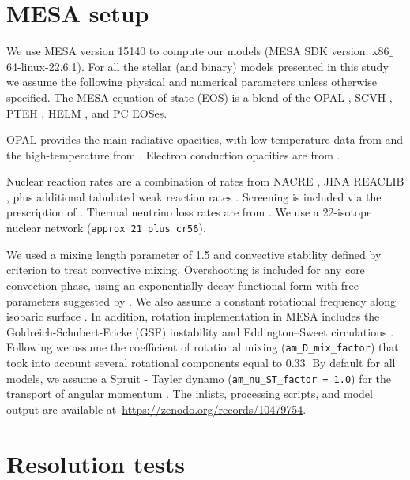 \documentclass{aa}
\begin{document}
\begin{appendix}


\section{MESA setup}
\label{sec:MESA_setup}


We use MESA version 15140 to compute our models (MESA SDK version: x86$\_$64-linux-22.6.1). For all the stellar (and binary) models presented in
this study we assume the following physical and numerical parameters
unless otherwise specified. The MESA equation of
state (EOS) is a blend of the OPAL \citet{Rogers2002}, SCVH
\citet{Saumon1995}, PTEH \citet{Pols1995}, HELM \citet{Timmes2000},
and PC \citet{Potekhin2010} EOSes.

OPAL \citep{Iglesias1993, Iglesias1996} provides the main radiative
opacities, with low-temperature data from \citet{Ferguson2005} and the
high-temperature from \citet{Buchler1976}. Electron conduction
opacities are from \citet{Cassisi2007}.

Nuclear reaction rates are a combination of rates from NACRE
\citep{Angulo1999}, JINA REACLIB \citep{Cyburt2010}, plus additional
tabulated weak reaction rates \citet{Fuller1985, Oda1994,
  Langanke2000}. Screening is included via the prescription of
\citet{Chugunov2007}.  Thermal neutrino loss rates are from
\citet{Itoh1996}. We use a
22-isotope nuclear network (\texttt{approx\_21\_plus\_cr56}).

We used a mixing length parameter of 1.5 and convective stability defined by
\citet{Ledoux_1947} criterion to treat convective mixing. Overshooting
is included for any core convection phase, using an exponentially
decay functional form \cite{Herwig_2000} with free parameters
suggested by \cite{claret:18}. We also assume a constant rotational frequency along
isobaric surface \citep{Ekstrom2012}. In addition, rotation
implementation in MESA includes the Goldreich-Schubert-Fricke (GSF)
instability \citep{Heger_2000} and Eddington–Sweet circulations
\citep{Sweet_1950}. Following \citet{Heger_2000} we assume the
coefficient of rotational mixing (\texttt{am\_D\_mix\_factor}) that
took into account several rotational components equal to 0.33.
By default for all models, we assume a Spruit - Tayler dynamo (\texttt{am\_nu\_ST\_factor = 1.0}) for the transport of angular momentum \citep{spruit:02}.
The inlists, processing scripts, and model output are available at~\url{https://zenodo.org/records/10479754}.


\section{Resolution tests}
\label{sec:resolution_test}




\end{appendix}
\end{document}
